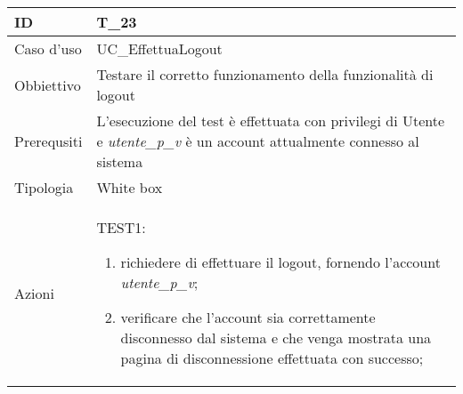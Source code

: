 \begin{table}[hb]
    \centering
    \begin{tabular}{ |p{2cm}|p{10cm}|  }
        \hline
        ID          & T\_23                                                                                                                      \\\hline
        Caso d'uso  & UC\_EffettuaLogout                                                                                                         \\\hline
        Obbiettivo  & Testare il corretto funzionamento della funzionalità di logout                                                             \\\hline
        Prerequsiti & L'esecuzione del test è effettuata con privilegi di Utente e \emph{utente\_p\_v} è un account attualmente connesso al sistema \\\hline
        Tipologia   & White box                                                                                                                  \\\hline
        Azioni      &
        TEST1:
        \begin{enumerate}[nosep, topsep=0pt]
            \item richiedere di effettuare il logout, fornendo l'account \emph{utente\_p\_v};
            \item verificare che l'account sia correttamente disconnesso dal sistema e che venga mostrata una pagina di disconnessione effettuata con successo;
        \end{enumerate}
        \\\hline
    \end{tabular}
\end{table}

